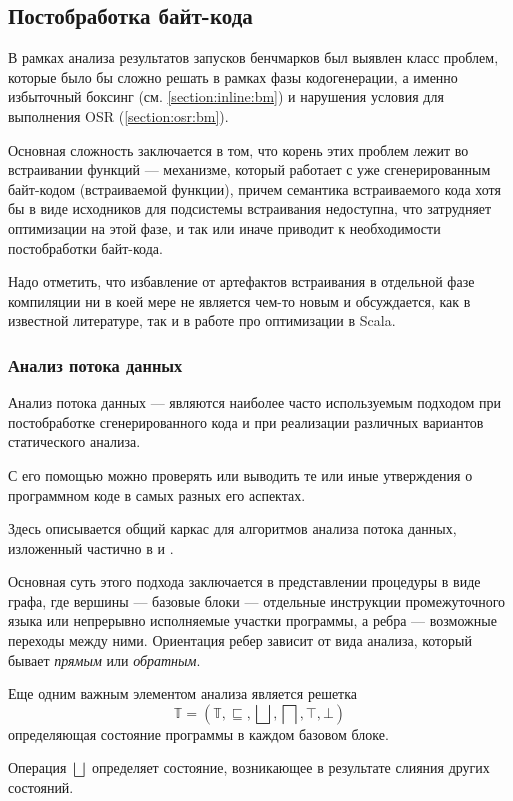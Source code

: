 \subsection{Постобработка байт-кода}
\label{section:postp}
В рамках анализа результатов запусков бенчмарков был выявлен класс проблем, которые было бы сложно
решать в рамках фазы кодогенерации, а именно избыточный боксинг (см. \ref{section:inline:bm}) и
нарушения условия для выполнения OSR (\ref{section:osr:bm}).

Основная сложность заключается в том, что корень этих проблем лежит во встраивании функций ---
механизме, который работает с уже сгенерированным байт-кодом (встраиваемой функции), причем
семантика встраиваемого кода хотя бы в виде исходников для подсистемы встраивания недоступна,
что затрудняет оптимизации на этой фазе, и так или иначе приводит к необходимости постобработки
байт-кода.

Надо отметить, что избавление от артефактов встраивания в отдельной фазе компиляции ни в коей мере
не является чем-то новым и обсуждается, как в известной литературе\cite{Muchnick}, так и в работе
про оптимизации в Scala\cite{ScalaDragos}.

\subsubsection{Анализ потока данных}
Анализ потока данных --- являются наиболее
часто используемым подходом при постобработке сгенерированного кода и при реализации
различных вариантов статического анализа.

С его помощью можно проверять или выводить те или иные утверждения о программном коде в самых разных
его аспектах.

Здесь описывается общий каркас для алгоритмов анализа потока данных, изложенный частично в \cite{Muchnick}
и \cite{Nielson}.

Основная суть этого подхода заключается в представлении процедуры в виде графа, где вершины ---
базовые блоки --- отдельные инструкции промежуточного языка или непрерывно исполняемые участки
программы, а ребра --- возможные переходы между ними.
Ориентация ребер зависит от вида анализа, который бывает \textit{прямым} или \textit{обратным}.

Еще одним важным элементом анализа является решетка
$$\mathbb{T} = (\mathbb{T}, \sqsubseteq, \bigsqcup, \bigsqcap, \top, \bot)$$
определяющая состояние программы в каждом базовом блоке.

Операция $\bigsqcup$ определяет состояние, возникающее в результате слияния других состояний.

